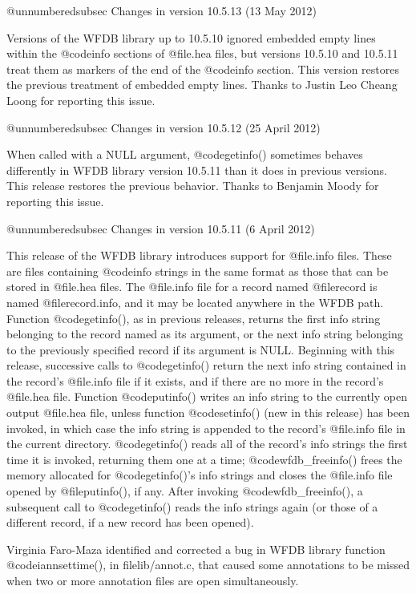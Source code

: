 {{{{{{{{@unnumberedsubsec Changes in version 10.5.13 (13 May 2012)

Versions of the WFDB library up to 10.5.10 ignored embedded empty lines
within the @code{info} sections of @file{.hea} files, but versions 10.5.10 and
10.5.11 treat them as markers of the end of the @code{info} section.  This
version restores the previous treatment of embedded empty lines.  Thanks
to Justin Leo Cheang Loong for reporting this issue.

@unnumberedsubsec Changes in version 10.5.12 (25 April 2012)

When called with a NULL argument, @code{getinfo()} sometimes behaves
differently in WFDB library version 10.5.11 than it does in previous versions.
This release restores the previous behavior.  Thanks to Benjamin Moody for
reporting this issue.

@unnumberedsubsec Changes in version 10.5.11 (6 April 2012)

This release of the WFDB library introduces support for @file{.info} files.
These are files containing @code{info} strings in the same format as those that
can be stored in @file{.hea} files.  The @file{.info} file for a record named
@file{record} is named @file{record.info}, and it may be located anywhere in
the WFDB path.  Function @code{getinfo()}, as in previous releases, returns the
first info string belonging to the record named as its argument, or the next
info string belonging to the previously specified record if its argument is
NULL.  Beginning with this release, successive calls to @code{getinfo()} return
the next info string contained in the record's @file{.info} file if it exists,
and if there are no more in the record's @file{.hea} file.  Function
@code{putinfo()} writes an info string to the currently open output @file{.hea}
file, unless function @code{setinfo()} (new in this release) has been invoked,
in which case the info string is appended to the record's @file{.info} file in
the current directory.  @code{getinfo()} reads all of the record's info strings
the first time it is invoked, returning them one at a time;
@code{wfdb_freeinfo()} frees the memory allocated for @code{getinfo()}'s info
strings and closes the @file{.info} file opened by @file{putinfo()}, if any.
After invoking @code{wfdb_freeinfo()}, a subsequent call to @code{getinfo()}
reads the info strings again (or those of a different record, if a new record
has been opened).

Virginia Faro-Maza identified and corrected a bug in WFDB library function
@code{iannsettime()}, in file{lib/annot.c}, that caused some annotations to be
missed when two or more annotation files are open simultaneously.

}}}}}}}}
